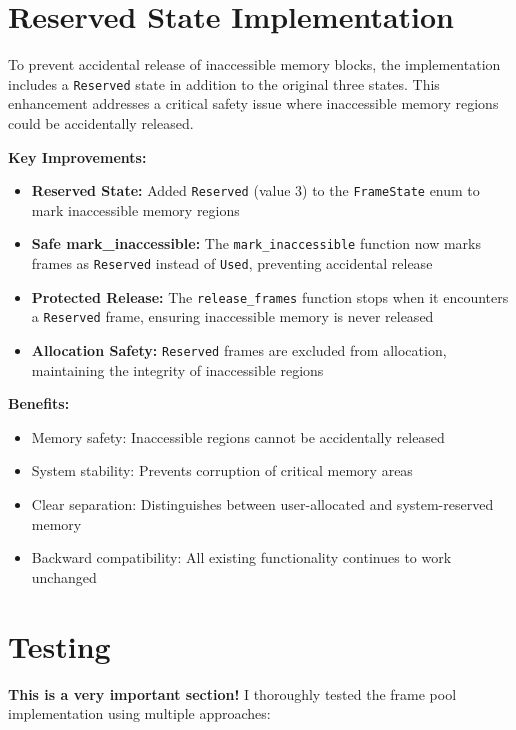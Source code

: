 \documentclass{article}
\begin{document}
\section*{Reserved State Implementation}

To prevent accidental release of inaccessible memory blocks, the implementation includes a \texttt{Reserved} state in addition to the original three states. This enhancement addresses a critical safety issue where inaccessible memory regions could be accidentally released.

\textbf{Key Improvements:}

\begin{itemize}
    \item \textbf{Reserved State:} Added \texttt{Reserved} (value 3) to the \texttt{FrameState} enum to mark inaccessible memory regions
    \item \textbf{Safe mark\_inaccessible:} The \texttt{mark\_inaccessible} function now marks frames as \texttt{Reserved} instead of \texttt{Used}, preventing accidental release
    \item \textbf{Protected Release:} The \texttt{release\_frames} function stops when it encounters a \texttt{Reserved} frame, ensuring inaccessible memory is never released
    \item \textbf{Allocation Safety:} \texttt{Reserved} frames are excluded from allocation, maintaining the integrity of inaccessible regions
\end{itemize}

\textbf{Benefits:}
\begin{itemize}
    \item Memory safety: Inaccessible regions cannot be accidentally released
    \item System stability: Prevents corruption of critical memory areas
    \item Clear separation: Distinguishes between user-allocated and system-reserved memory
    \item Backward compatibility: All existing functionality continues to work unchanged
\end{itemize}

\section*{Testing}

\textbf{This is a very important section!} I thoroughly tested the frame pool implementation using multiple approaches:
\end{document}

